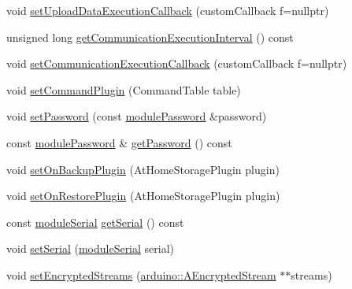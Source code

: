 \begin{DoxyCompactItemize}
\item 
void \mbox{\hyperlink{classathome_1_1module_1_1_at_home_module_a24130398678c98c500e211b676fa5079}{set\+Upload\+Data\+Execution\+Callback}} (custom\+Callback f=nullptr)
\item 
unsigned long \mbox{\hyperlink{classathome_1_1module_1_1_at_home_module_a263fe0bea2fa480b3885fee07e2a8221}{get\+Communication\+Execution\+Interval}} () const
\item 
void \mbox{\hyperlink{classathome_1_1module_1_1_at_home_module_a8c3585c35b11fe5b70438678b54f3970}{set\+Communication\+Execution\+Callback}} (custom\+Callback f=nullptr)
\item 
void \mbox{\hyperlink{classathome_1_1module_1_1_at_home_module_aa1b0c8e38ad6baf46f7d05285c35b255}{set\+Command\+Plugin}} (Command\+Table table)
\item 
void \mbox{\hyperlink{classathome_1_1module_1_1_at_home_module_a7853c8cc0139c956d1d1a941d7145391}{set\+Password}} (const \mbox{\hyperlink{classathome_1_1module_1_1_at_home_module_a628bd00cf83073b87c41a3ce2b362a9c}{module\+Password}} \&password)
\item 
const \mbox{\hyperlink{classathome_1_1module_1_1_at_home_module_a628bd00cf83073b87c41a3ce2b362a9c}{module\+Password}} \& \mbox{\hyperlink{classathome_1_1module_1_1_at_home_module_af322578d47001b20d5e5fb8da65dbf93}{get\+Password}} () const
\item 
void \mbox{\hyperlink{classathome_1_1module_1_1_at_home_module_af7e6ed7d4dc72c0cef209704fab0e3af}{set\+On\+Backup\+Plugin}} (At\+Home\+Storage\+Plugin plugin)
\item 
void \mbox{\hyperlink{classathome_1_1module_1_1_at_home_module_ae359941a4f2e571a052a30916a306e48}{set\+On\+Restore\+Plugin}} (At\+Home\+Storage\+Plugin plugin)
\item 
const \mbox{\hyperlink{classathome_1_1module_1_1_at_home_module_aaa31c8eddb689010ef59deba4e1463c6}{module\+Serial}} \mbox{\hyperlink{classathome_1_1module_1_1_at_home_module_a1267bc33e38b25ba52bceddc60ea7df1}{get\+Serial}} () const
\item 
void \mbox{\hyperlink{classathome_1_1module_1_1_at_home_module_a053f38453530fd881376ed1596a14e09}{set\+Serial}} (\mbox{\hyperlink{classathome_1_1module_1_1_at_home_module_aaa31c8eddb689010ef59deba4e1463c6}{module\+Serial}} serial)
\item 
void \mbox{\hyperlink{classathome_1_1module_1_1_at_home_module_ae4423d28b7b05d3164f214e163d59739}{set\+Encrypted\+Streams}} (\mbox{\hyperlink{classathome_1_1arduino_1_1_a_encrypted_stream}{arduino\+::\+A\+Encrypted\+Stream}} $\ast$$\ast$streams)
$$
\end{DoxyCompactItemize}
